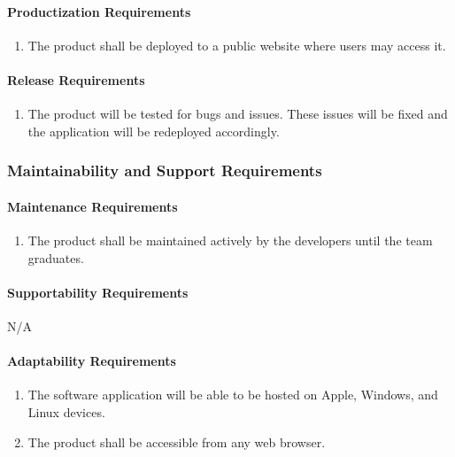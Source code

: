 \documentclass[12pt]{article}
\begin{document}
\paragraph{Productization Requirements}
\begin{enumerate}[{OE}1., leftmargin=2\parindent, resume]
    \item The product shall be deployed to a public website where users may access it.
\end{enumerate}

\paragraph{Release Requirements}
\begin{enumerate}[{OE}1., leftmargin=2\parindent, resume]
    \item The product will be tested for bugs and issues. These issues will be fixed and the application will be redeployed accordingly.
\end{enumerate}



\subsubsection{Maintainability and Support Requirements}
\label{NFR_MS}
\paragraph{Maintenance Requirements}
\begin{enumerate}[{MS}1., leftmargin=2\parindent]
    \item The product shall be maintained actively by the developers until the \progname{} team graduates.
\end{enumerate}

\paragraph{Supportability Requirements}
N/A

\paragraph{Adaptability Requirements}
\begin{enumerate}[{MS}1., leftmargin=2\parindent, resume]
    \item The software application will be able to be hosted on Apple, Windows, and Linux devices.
    \item The product shall be accessible from any web browser.
\end{enumerate}
\end{document}
